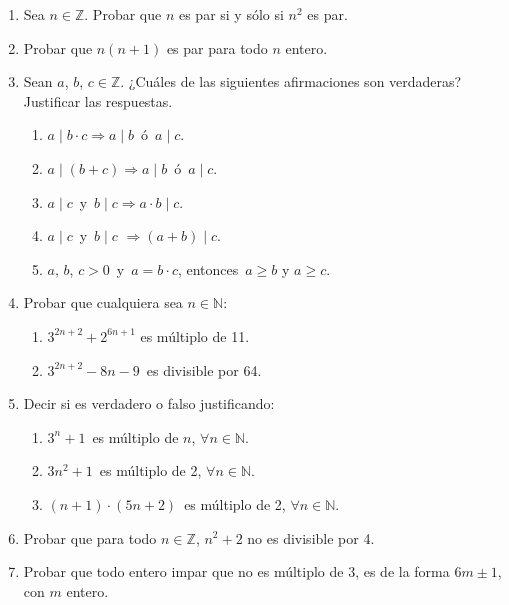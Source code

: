 \documentclass[a4paper,12pt,twoside,spanish,reqno]{amsbook}
\numberwithin{equation}{section}
\begin{document}
\begin{enumerate}
\item Sea $n\in \mathbb Z$. Probar que $n$ es par si y sólo si $n^2$ es par.


\item Probar que $n(n+1)$ es par para todo $n$ entero.


\item Sean $a$, $b$, $c \in {\mathbb Z}$. ¿Cuáles de las siguientes afirmaciones son verdaderas? Justificar las respuestas.
    \begin{enumerate}
        \item $a \mid b\cdot c \Rightarrow a \mid b$\, ó \,$a \mid c$.
        \item $a \mid (b+c) \Rightarrow a\mid b$\, ó \,$a \mid c$.
        \item $a \mid c$\, y \,$b \mid c \Rightarrow a\cdot b \mid c$.
        \item $a \mid c$\, y \,$b \mid c$ $\Rightarrow (a +b) \mid c$.
        \item $a$, $b$, $c>0$\, y \,$a=b\cdot c$, entonces\, $a \ge b$ y $a \ge c$.
    \end{enumerate}



\item Probar que cualquiera sea $n \in {\mathbb N}$:
    \begin{enumerate}
        \item $3^{2n+2}+ 2^{6n+1}$ es múltiplo de 11.
        \item $3^{2n+2} - 8n - 9$\, es divisible por 64.
    \end{enumerate}


\item Decir si es verdadero o falso justificando:
    \begin{enumerate}
        \item $3^n+1$\, es múltiplo de $n$, $\forall n \in {\mathbb N}$.
        \item $3n^2+1$\, es múltiplo de 2, $\forall n \in {\mathbb N}$.
        \item $(n+1)\cdot (5n+2)$\, es múltiplo de 2, $\forall n \in {\mathbb N}$.
    \end{enumerate}


\item Probar que para todo $n \in {\mathbb Z}$, $n^2 + 2$ no es divisible por 4.


\item Probar que todo entero impar que no es múltiplo de 3, es de la forma $6m\pm 1$, con $m$ entero.



\end{enumerate}
\end{document}
